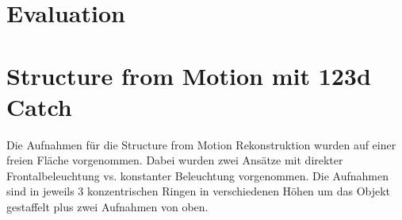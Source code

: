 \documentclass[]{article}
\begin{document}
\subsection{}

\section{Evaluation}

\subsection{}
\subsection{}
\subsection{}


\section{Structure from Motion mit 123d Catch} %

Die Aufnahmen für die Structure from Motion Rekonstruktion wurden auf einer freien Fläche vorgenommen. Dabei wurden zwei Ansätze mit direkter Frontalbeleuchtung vs. konstanter Beleuchtung vorgenommen.
Die Aufnahmen sind in jeweils 3 konzentrischen Ringen in verschiedenen Höhen um das Objekt gestaffelt plus zwei Aufnahmen von oben.

\subsection{}
\subsection{}
\subsection{}

		
\end{document}
